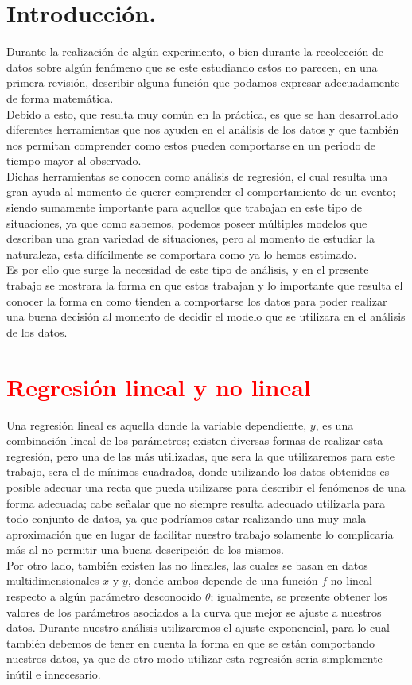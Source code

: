 \documentclass[12pt]{article}
\begin{document}
\section*{Introducción.}
Durante la realización de algún experimento, o bien durante la recolección de datos sobre algún fenómeno que se este estudiando estos no parecen, en una primera revisión, describir alguna función que podamos expresar adecuadamente de forma matemática.\\
Debido a esto, que resulta muy común en la práctica, es que se han desarrollado diferentes herramientas que nos ayuden en el análisis de los datos y que también nos permitan comprender como estos pueden comportarse en un periodo de tiempo mayor al observado.\\
Dichas herramientas se conocen como análisis de regresión, el cual resulta una gran ayuda al momento de querer comprender el comportamiento de un evento; siendo sumamente importante para aquellos que trabajan en este tipo de situaciones, ya que como sabemos, podemos poseer múltiples modelos que describan una gran variedad de situaciones, pero al momento de estudiar la naturaleza, esta difícilmente se comportara como ya lo hemos estimado.\\
Es por ello que surge la necesidad de este tipo de análisis, y en el presente trabajo se mostrara la forma en que estos trabajan y lo importante que resulta el conocer la forma en como tienden a comportarse los datos para poder realizar una buena decisión al momento de decidir el modelo que se utilizara en el análisis de los datos.\cite{1}
 
\section*{\textcolor{Red}{Regresión lineal y no lineal}}
Una regresión lineal es aquella donde la variable dependiente, $y$, es una combinación lineal de los parámetros; existen diversas formas de realizar esta regresión, pero una de las más utilizadas, que sera la que utilizaremos para este trabajo, sera el de mínimos cuadrados, donde utilizando los datos obtenidos es posible adecuar una recta que pueda utilizarse para describir el fenómenos de una forma adecuada; cabe señalar que no siempre resulta adecuado utilizarla para todo conjunto de datos, ya que podríamos estar realizando una muy mala aproximación que en lugar de facilitar nuestro trabajo solamente lo complicaría más al no permitir una buena descripción de los mismos.\cite{1}\\
Por otro lado, también existen las no lineales, las cuales se basan en datos multidimensionales $x$ y $y$, donde ambos depende de una función $f$ no lineal respecto a algún parámetro desconocido $\theta$; igualmente, se presente obtener los valores de los parámetros asociados a la curva que mejor se ajuste a nuestros datos. Durante nuestro análisis utilizaremos el ajuste exponencial, para lo cual también debemos de tener en cuenta la forma en que se están comportando nuestros datos, ya que de otro modo utilizar esta regresión seria simplemente inútil e innecesario.\cite{2}
\pagebreak
\end{document}
